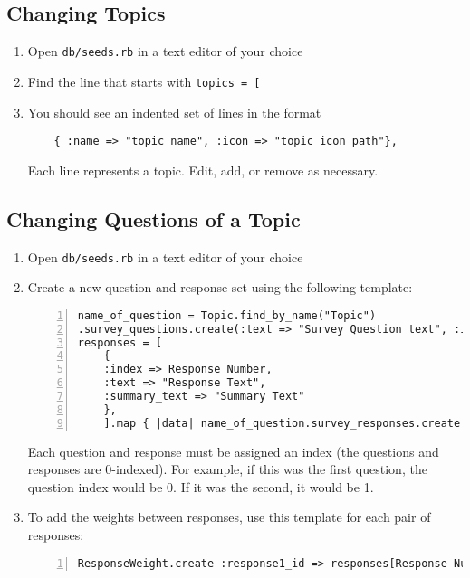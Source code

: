 \documentclass[12pt]{article}
\begin{document}
\subsection{Changing Topics}
\begin{enumerate}
    \item Open \texttt{db/seeds.rb} in a text editor of your choice
    \item Find the line that starts with \texttt{topics = [}
    \item You should see an indented set of lines in the format
    \begin{verbatim}
    { :name => "topic name", :icon => "topic icon path"},
    \end{verbatim}
    Each line represents a topic. Edit, add, or remove as necessary.
\end{enumerate}

\pagebreak
\subsection{Changing Questions of a Topic}
\begin{enumerate}
    \item Open \texttt{db/seeds.rb} in a text editor of your choice
    \item Create a new question and response set using the following template:
        \begin{lstlisting}[frame=single, numbers=left, breaklines=true]
name_of_question = Topic.find_by_name("Topic")
.survey_questions.create(:text => "Survey Question text", :index => Question Number)
responses = [
    {
    :index => Response Number,
    :text => "Response Text",
    :summary_text => "Summary Text"
    },
    ].map { |data| name_of_question.survey_responses.create data }
        \end{lstlisting}
        Each question and response must be assigned an index (the questions and
        responses are 0-indexed). For example, if this was the first question, the
        question index would be 0. If it was the second, it would be 1.
    \item To add the weights between responses, use this template for each pair
        of responses:
        \begin{lstlisting}[frame=single, numbers=left, breaklines=true]
ResponseWeight.create :response1_id => responses[Response Number].id, :response2_id => responses[Response Number].id, :weight => [weight]
        \end{lstlisting}
\end{enumerate}
\end{document}

